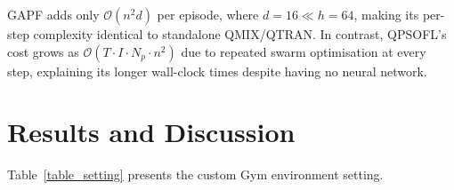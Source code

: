 \begin{table}[!ht]
\caption{Time complexity comparison. $n$: sensors, $T$: steps/episode, $h$: RNN hidden dim (64), $d$: GNN embed dim (16), $N_p$: PSO particles (32), $I$: PSO iterations (50).}
\label{tab:complexity}
\renewcommand{\arraystretch}{1.0}
\end{table}

\noindent GAPF adds only $\mathcal{O}(n^2 d)$ per episode, where $d = 16 \ll h = 64$, making its per-step complexity identical to standalone QMIX/QTRAN. In contrast, QPSOFL's cost grows as $\mathcal{O}(T \cdot I \cdot N_p \cdot n^2)$ due to repeated swarm optimisation at every step, explaining its longer wall-clock times despite having no neural network.



\section{Results and Discussion}

Table~\ref{table_setting} presents the custom Gym environment setting.

\begin{table}[!ht]
\caption{Custom Gym Environment setting.}
\label{table_setting}
\renewcommand{\arraystretch}{1.0}
\end{table}

